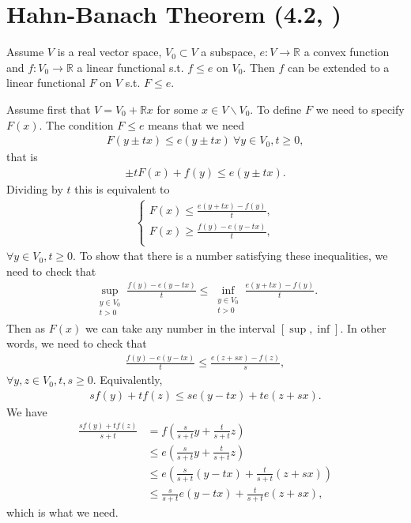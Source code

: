 \section{Hahn-Banach Theorem \tiny{ (4.2, \cite{Gerald_Teschl})}}
\begin{theorem}
    Assume \(V\) is a real vector space, \(V_0\subset V\) a subspace, \(e:V\rightarrow\mathbb{R}\) a convex function and 
    \(f:V_0\rightarrow\mathbb{R}\) a linear functional s.t. \(f\leq e\) on \(V_0\). Then \(f\) can be extended to a linear functional 
    \(F\) on \(V\) s.t. \(F\leq e\).
\end{theorem}
\ifdetailed
Assume first that \(V = V_0 + \mathbb{R}x\) for some \(x\in V\backslash V_0\). To define \(F\) we need to specify \(F(x)\). The condition \(F\leq e\)
means that we need
\begin{align*}
    F(y\pm tx) \leq e(y\pm tx) \ \forall y\in V_0, t\geq 0,
\end{align*}
that is 
\begin{align*}
    \pm t F(x) + f(y) \leq e(y\pm tx).
\end{align*}
Dividing by \(t\) this is equivalent to 
\begin{align*}
    \begin{cases} 
        F(x) \leq \frac{e(y+tx)-f(y)}{t}, \\
        F(x) \geq \frac{f(y)-e(y-tx)}{t}, \\
     \end{cases}
\end{align*}
\(\forall y\in V_0, t\geq0\). To show that there is a number satisfying these inequalities, we need to check that
\begin{align*}
    \sup\limits_{\substack{y\in V_0 \\ t>0}} \frac{f(y)-e(y-tx)}{t} \leq \inf\limits_{\substack{y\in V_0 \\ t>0}} \frac{e(y+tx)-f(y)}{t}.
\end{align*}
Then as \(F(x)\) we can take any number in the interval \([\sup,\inf]\). In other words, we need to check that
\begin{align*}
    \frac{f(y)-e(y-tx)}{t} \leq \frac{e(z+sx)-f(z)}{s},
\end{align*}
\(\forall y,z\in V_0, t,s\geq0\). Equivalently, 
\begin{align*}
    sf(y) + tf(z) \leq se(y-tx) + te(z+sx).
\end{align*}
We have
\begin{align*}
    \frac{sf(y) +tf(z)}{s+t} &= f\left(\frac{s}{s+t}y + \frac{t}{s+t}z\right) \\
    &\leq e\left(\frac{s}{s+t}y + \frac{t}{s+t}z\right) \\
    &\leq e\left(\frac{s}{s+t}(y-tx) + \frac{t}{s+t}(z+sx)\right) \\
    &\leq \frac{s}{s+t}e\left(y-tx\right) + \frac{t}{s+t}e\left(z+sx\right),
\end{align*}
which is what we need. 

